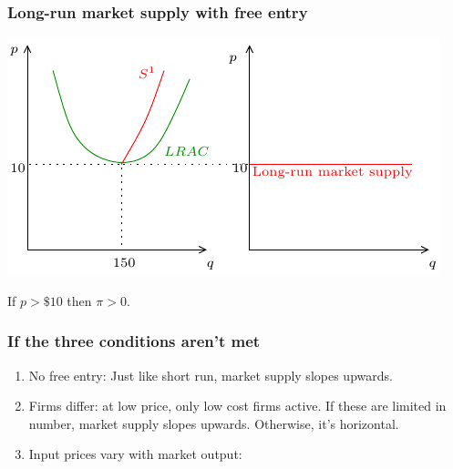 \documentclass[xcolor=pdftex,dvipsnames]{beamer}
\begin{document}
\begin{frame}
\frametitle{Long-run market supply with free entry}
\begin{center}
\includegraphics{pics/LRMS2}
\end{center}
If $p>\$10$ then  $\pi>0$. \\
\end{frame}








\begin{frame}
\frametitle{If the three conditions aren't met}
\begin{enumerate}[<+->]
\item No free entry: Just like short run, market supply slopes
  upwards.
\item Firms differ: at low price, only low cost firms active. If these
  are limited in number, market supply slopes upwards. Otherwise, it's
  horizontal.
\item Input prices vary with market output: 

\begin{enumerate}
\end{enumerate}
\end{enumerate}
\end{frame}
\end{document}
